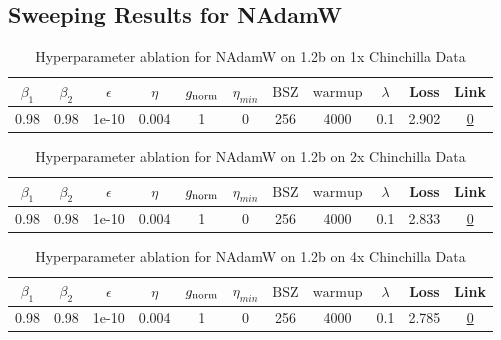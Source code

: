 \subsection{Sweeping Results for NAdamW}%
\begin{table}[H]
\centering
\caption{Hyperparameter ablation for NAdamW on 1.2b on 1x Chinchilla Data}
\label{tab:ablation_nadamw_1.2b_on_1x_chinchilla_data}
\begin{tabular}{ccccccccccc}
\toprule
$\beta_1$ & $\beta_2$ & $\epsilon$ & $\eta$ & $g_{\mathrm{norm}}$ & $\eta_{min}$ & $\mathrm{BSZ}$ & $\mathrm{warmup}$ & $\lambda$ & Loss & Link \\
\midrule
0.98 & 0.98 & 1e-10 & 0.004 & 1 & 0 & 256 & 4000 & 0.1 & 2.902 & \href{https://wandb.ai/marin-community/optimizer-scaling/runs/sweep-1.2b-24B-nadamwf62d1blr0.004-wd0.1-minlr0.0-warmup4000-b10-642070}{0} \\
\midrule
\bottomrule
\end{tabular}
\end{table}

\begin{table}[H]
\centering
\caption{Hyperparameter ablation for NAdamW on 1.2b on 2x Chinchilla Data}
\label{tab:ablation_nadamw_1.2b_on_2x_chinchilla_data}
\begin{tabular}{ccccccccccc}
\toprule
$\beta_1$ & $\beta_2$ & $\epsilon$ & $\eta$ & $g_{\mathrm{norm}}$ & $\eta_{min}$ & $\mathrm{BSZ}$ & $\mathrm{warmup}$ & $\lambda$ & Loss & Link \\
\midrule
0.98 & 0.98 & 1e-10 & 0.004 & 1 & 0 & 256 & 4000 & 0.1 & 2.833 & \href{https://wandb.ai/marin-community/optimizer-scaling/runs/sweep-1.2b-48B-nadamwcb7c09lr0.004-wd0.1-minlr0.0-warmup4000-b10-cf4ac5}{0} \\
\midrule
\bottomrule
\end{tabular}
\end{table}

\begin{table}[H]
\centering
\caption{Hyperparameter ablation for NAdamW on 1.2b on 4x Chinchilla Data}
\label{tab:ablation_nadamw_1.2b_on_4x_chinchilla_data}
\begin{tabular}{ccccccccccc}
\toprule
$\beta_1$ & $\beta_2$ & $\epsilon$ & $\eta$ & $g_{\mathrm{norm}}$ & $\eta_{min}$ & $\mathrm{BSZ}$ & $\mathrm{warmup}$ & $\lambda$ & Loss & Link \\
\midrule
0.98 & 0.98 & 1e-10 & 0.004 & 1 & 0 & 256 & 4000 & 0.1 & 2.785 & \href{https://wandb.ai/marin-community/optimizer-scaling/runs/sweep-1.2b-96B-nadamw8e7088lr0.004-wd0.1-minlr0.0-warmup4000-b10-3c3e6a}{0} \\
\midrule
\bottomrule
\end{tabular}
\end{table}

